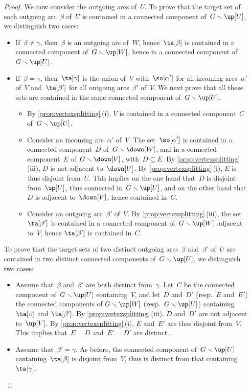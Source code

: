 \documentclass{amsart}
\theoremstyle{definition}
\newcommand{\ssm}{\smallsetminus} %
\begin{document}
\begin{proof}
  We now consider the outgoing arcs of~$U$.
  To prove that the target set of each outgoing arc~$\beta$ of~$U$ is contained in a connected component of~$G \ssm \up[U]$, we distinguish two cases:
  \begin{itemize}
    \item If~$\beta \ne \gamma$, then~$\beta$ is an outgoing arc of~$W$, hence~$\ta[\beta]$ is contained in a connected component of~$G \ssm \up[W]$, hence in a connected component of~$G \ssm \up[U]$.
    \item If~$\beta = \gamma$, then~$\ta[\gamma]$ is the union of~$V$ with~$\so[\alpha']$ for all incoming arcs~$\alpha'$ of~$V$ and~$\ta[\beta']$ for all outgoing arcs~$\beta'$ of~$V$. We next prove that all these sets are contained in the same connected component of~$G \ssm \up[U]$.
    \begin{itemize}
      \item By \cref{prop:vertexsplitting}\,(i), $V$ is contained in a connected component~$C$ of~$G \ssm \up[U]$. 
      \item Consider an incoming arc~$\alpha'$ of~$V$. The set~$\so[\alpha']$ is contained in a connected component~$D$ of~$G \ssm \down[W]$, and in a connected component~$E$ of~$G \ssm \down[V]$, with~$D \subseteq E$. By \cref{prop:vertexsplitting}\,(iii), $D$ is not adjacent to~$\down[U]$. By \cref{prop:vertexsplitting}\,(i), $E$ is thus disjoint from~$U$. This implies on the one hand that~$D$ is disjoint from~$\up[U]$, thus connected in~$G \ssm \up[U]$, and on the other hand that~$D$ is adjacent to~$\down[V]$, hence contained in~$C$. 
      \item Consider an outgoing arc~$\beta'$ of~$V$. By \cref{prop:vertexsplitting}\,(iii), the set $\ta[\beta']$ is contained in a connected component of~$G \ssm \up[W]$ adjacent to~$V$, hence $\ta[\beta']$ is contained in~$C$.
    \end{itemize}
  \end{itemize}
  To prove that the target sets of two distinct outgoing arcs~$\beta$ and~$\beta'$ of~$U$ are contained in two distinct connected components of~$G \ssm \up[U]$, we distinguish two cases:
  \begin{itemize}
  \item Assume that~$\beta$ and~$\beta'$ are both distinct from~$\gamma$. Let~$C$ be the connected component of~$G \ssm \up[U]$ containing~$V$, and let~$D$ and~$D'$ (resp.~$E$ and~$E'$) the connected components of $G \ssm \up[W]$ (resp.~$G \ssm \up[U]$) containing~$\ta[\beta]$ and $\ta[\beta']$. By \cref{prop:vertexsplitting}\,(iii), $D$ and~$D'$ are not adjacent to~$\up[V]$. By \cref{prop:vertexsplitting}\,(i), $E$ and~$E'$ are thus disjoint from~$V$. This implies that~$E = D$ and~$E' = D'$ are distinct.
  \item Assume that~$\beta' = \gamma$. As before, the connected component of~$G \ssm \up[U]$ containing~$\ta[\beta]$ is disjoint from~$V$, thus is distinct from that containing~$\ta[\gamma]$.
  \qedhere
  \end{itemize}
\end{proof}
\end{document}
